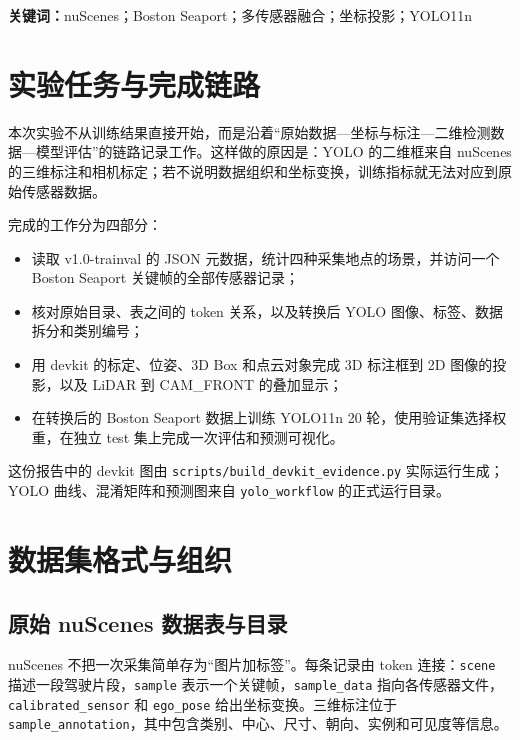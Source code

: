 \documentclass[UTF8,zihao=-4,fontset=windows]{ctexart}
\begin{document}
\noindent\textbf{关键词：}nuScenes；Boston Seaport；多传感器融合；坐标投影；YOLO11n

\clearpage

\section{实验任务与完成链路}

本次实验不从训练结果直接开始，而是沿着“原始数据---坐标与标注---二维检测数据---模型评估”的链路记录工作。这样做的原因是：YOLO 的二维框来自 nuScenes 的三维标注和相机标定；若不说明数据组织和坐标变换，训练指标就无法对应到原始传感器数据。

完成的工作分为四部分：
\begin{itemize}
  \item 读取 v1.0-trainval 的 JSON 元数据，统计四种采集地点的场景，并访问一个 Boston Seaport 关键帧的全部传感器记录；
  \item 核对原始目录、表之间的 token 关系，以及转换后 YOLO 图像、标签、数据拆分和类别编号；
  \item 用 devkit 的标定、位姿、3D Box 和点云对象完成 3D 标注框到 2D 图像的投影，以及 LiDAR 到 CAM\_FRONT 的叠加显示；
  \item 在转换后的 Boston Seaport 数据上训练 YOLO11n 20 轮，使用验证集选择权重，在独立 test 集上完成一次评估和预测可视化。
\end{itemize}

这份报告中的 devkit 图由 \texttt{scripts/build\_devkit\_evidence.py} 实际运行生成；YOLO 曲线、混淆矩阵和预测图来自 \texttt{yolo\_workflow} 的正式运行目录。

\section{数据集格式与组织}

\subsection{原始 nuScenes 数据表与目录}

nuScenes 不把一次采集简单存为“图片加标签”。每条记录由 token 连接：\texttt{scene} 描述一段驾驶片段，\texttt{sample} 表示一个关键帧，\texttt{sample\_data} 指向各传感器文件，\texttt{calibrated\_sensor} 和 \texttt{ego\_pose} 给出坐标变换。三维标注位于 \texttt{sample\_annotation}，其中包含类别、中心、尺寸、朝向、实例和可见度等信息。
\end{document}
